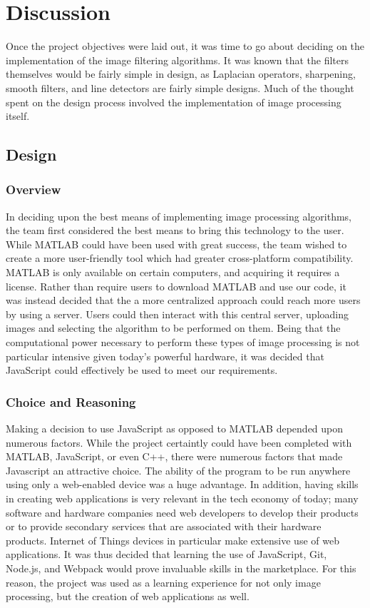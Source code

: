 \documentclass{article}
\let\Oldsection\section
\renewcommand{\section}{\FloatBarrier\Oldsection}
\let\Oldsubsection\subsection
\renewcommand{\subsection}{\FloatBarrier\Oldsubsection}
\let\Oldsubsubsection\subsubsection
\renewcommand{\subsubsection}{\FloatBarrier\Oldsubsubsection}
\begin{document}
  \newpage

  \section{Discussion}

  Once the project objectives were laid out, it was time to go about deciding on the implementation of the image filtering algorithms. It was known that the filters themselves would be fairly simple in design, as Laplacian operators, sharpening, smooth filters, and line detectors are fairly simple designs. Much of the thought spent on the design process involved the implementation of image processing itself.

  \subsection{Design}

  \subsubsection{Overview}

  In deciding upon the best means of implementing image processing algorithms, the team first considered the best means to bring this technology to the user. While MATLAB could have been used with great success, the team wished to create a more user-friendly tool which had greater cross-platform compatibility. MATLAB is only available on certain computers, and acquiring it requires a license. Rather than require users to download MATLAB and use our code, it was instead decided that the a more centralized approach could reach more users by using a server. Users could then interact with this central server, uploading images and selecting the algorithm to be performed on them. Being that the computational power necessary to perform these types of image processing is not particular intensive given today's powerful hardware, it was decided that JavaScript  could effectively be used to meet our requirements. 
  
  \subsubsection{Choice and Reasoning}

  Making a decision to use JavaScript as opposed to MATLAB depended upon numerous factors. While the project certaintly could have been completed with MATLAB, JavaScript, or even C++, there were numerous factors that made Javascript an attractive choice. The ability of the program to be run anywhere using only a web-enabled device was a huge advantage. In addition, having skills in creating web applications is very relevant in the tech economy of today; many software and hardware companies need web developers to develop their products or to provide secondary services that are associated with their hardware products. Internet of Things devices in particular make extensive use of web applications. It was thus decided that learning the use of JavaScript, Git, Node.js, and Webpack would prove invaluable skills in the marketplace. For this reason, the project was used as a learning experience for not only image processing, but the creation of web applications as well.
\end{document}
